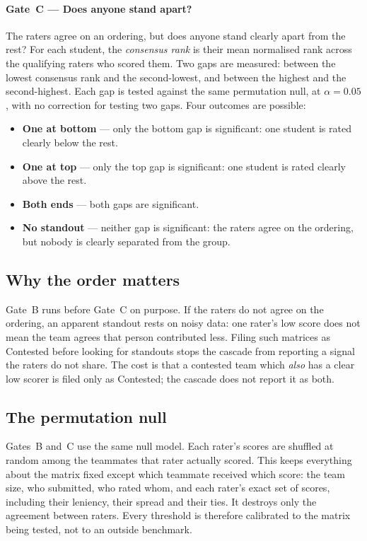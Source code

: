 \paragraph{Gate~C --- Does anyone stand apart?}
The raters agree on an ordering, but does anyone stand clearly apart from the
rest? For each student, the \emph{consensus rank} is their mean normalised rank
across the qualifying raters who scored them. Two gaps are measured: between
the lowest consensus rank and the second-lowest, and between the highest and
the second-highest. Each gap is tested against the same permutation null, at
$\alpha = 0.05$, with no correction for testing two gaps. Four outcomes are
possible:
\begin{itemize}
  \item \textbf{One at bottom} --- only the bottom gap is significant: one
    student is rated clearly below the rest.
  \item \textbf{One at top} --- only the top gap is significant: one student is
    rated clearly above the rest.
  \item \textbf{Both ends} --- both gaps are significant.
  \item \textbf{No standout} --- neither gap is significant: the raters agree
    on the ordering, but nobody is clearly separated from the group.
\end{itemize}

\subsection{Why the order matters}
\label{sec:cascade-order}

Gate~B runs before Gate~C on purpose. If the raters do not agree on the
ordering, an apparent standout rests on noisy data: one rater's low score does
not mean the team agrees that person contributed less. Filing such matrices as
Contested before looking for standouts stops the cascade from reporting a
signal the raters do not share. The cost is that a contested team which
\emph{also} has a clear low scorer is filed only as Contested; the cascade does
not report it as both.

\subsection{The permutation null}
\label{sec:perm-null}

Gates~B and~C use the same null model. Each rater's scores are shuffled at
random among the teammates that rater actually scored. This keeps everything
about the matrix fixed except which teammate received which score: the team
size, who submitted, who rated whom, and each rater's exact set of scores,
including their leniency, their spread and their ties. It destroys only the
agreement between raters. Every threshold is therefore calibrated to the matrix
being tested, not to an outside benchmark.

